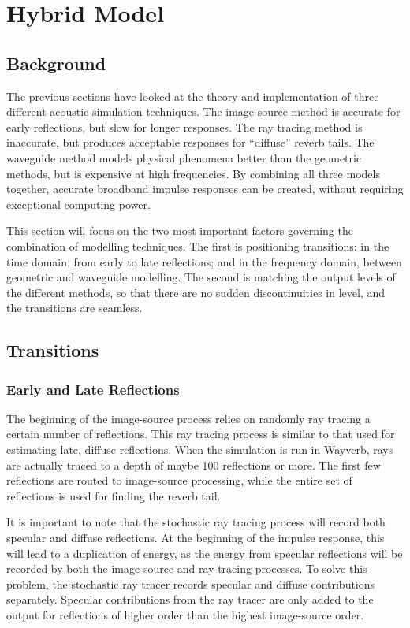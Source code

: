 \documentclass[]{scrreprt}
\begin{document}
\chapter{Hybrid Model}\label{hybrid-model}

\section{Background}\label{background-3}

The previous sections have looked at the theory and implementation of
three different acoustic simulation techniques. The image-source method
is accurate for early reflections, but slow for longer responses. The
ray tracing method is inaccurate, but produces acceptable responses for
``diffuse'' reverb tails. The waveguide method models physical phenomena
better than the geometric methods, but is expensive at high frequencies.
By combining all three models together, accurate broadband impulse
responses can be created, without requiring exceptional computing power.

This section will focus on the two most important factors governing the
combination of modelling techniques. The first is positioning
transitions: in the time domain, from early to late reflections; and in
the frequency domain, between geometric and waveguide modelling. The
second is matching the output levels of the different methods, so that
there are no sudden discontinuities in level, and the transitions are
seamless.

\section{Transitions}\label{transitions}

\subsection{Early and Late
Reflections}\label{early-and-late-reflections}

The beginning of the image-source process relies on randomly ray tracing
a certain number of reflections. This ray tracing process is similar to
that used for estimating late, diffuse reflections. When the simulation
is run in Wayverb, rays are actually traced to a depth of maybe 100
reflections or more. The first few reflections are routed to
image-source processing, while the entire set of reflections is used for
finding the reverb tail.

It is important to note that the stochastic ray tracing process will
record both specular and diffuse reflections. At the beginning of the
impulse response, this will lead to a duplication of energy, as the
energy from specular reflections will be recorded by both the
image-source and ray-tracing processes. To solve this problem, the
stochastic ray tracer records specular and diffuse contributions
separately. Specular contributions from the ray tracer are only added to
the output for reflections of higher order than the highest image-source
order.
\end{document}

